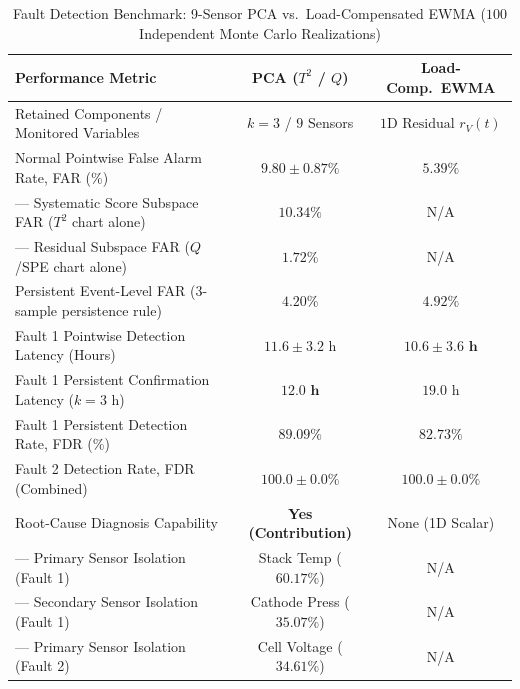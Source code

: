 \documentclass[conference]{IEEEtran}
\begin{document}
\begin{table}[t]
\caption{Fault Detection Benchmark: 9-Sensor PCA vs.\ Load-Compensated EWMA ($100$ Independent Monte Carlo Realizations)}
\begin{center}
\begin{tabular}{lcc}
\toprule
Performance Metric & \textbf{PCA ($T^2$ / $Q$)} & \textbf{Load-Comp.\ EWMA} \\
\midrule
Retained Components / Monitored Variables & $k=3$ / $9$ Sensors & $1\text{D Residual } r_V(t)$ \\
Normal Pointwise False Alarm Rate, FAR (\%) & $9.80 \pm 0.87\%$ & $\mathbf{5.39\%}$ \\
--- Systematic Score Subspace FAR ($T^2$ chart alone) & $10.34\%$ & N/A \\
--- Residual Subspace FAR ($Q$/SPE chart alone) & $\mathbf{1.72\%}$ & N/A \\
Persistent Event-Level FAR ($3$-sample persistence rule) & $\mathbf{4.20\%}$ & $\mathbf{4.92\%}$ \\
\midrule
Fault 1 Pointwise Detection Latency (Hours) & $11.6 \pm 3.2\text{ h}$ & $\mathbf{10.6 \pm 3.6\text{ h}}$ \\
Fault 1 Persistent Confirmation Latency ($k=3\text{ h}$) & $\mathbf{12.0\text{ h}}$ & $19.0\text{ h}$ \\
Fault 1 Persistent Detection Rate, FDR (\%) & $\mathbf{89.09\%}$ & $82.73\%$ \\
Fault 2 Detection Rate, FDR (Combined) & $\mathbf{100.0 \pm 0.0\%}$ & $\mathbf{100.0 \pm 0.0\%}$ \\
\midrule
Root-Cause Diagnosis Capability & \textbf{Yes (Contribution)} & None (1D Scalar) \\
--- Primary Sensor Isolation (Fault 1) & Stack Temp ($60.17\%$) & N/A \\
--- Secondary Sensor Isolation (Fault 1) & Cathode Press ($35.07\%$) & N/A \\
--- Primary Sensor Isolation (Fault 2) & Cell Voltage ($34.61\%$) & N/A \\
\bottomrule
\end{tabular}
\label{tab:pca_bench}
\end{center}
\end{table}
\end{document}
